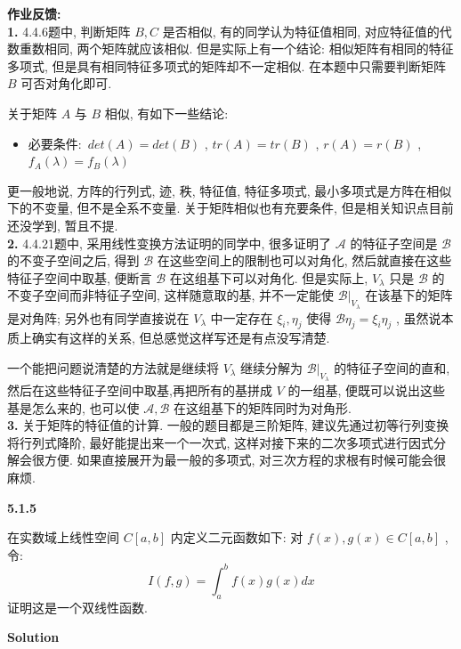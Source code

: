 \documentclass[11pt,a4paper,openany,oneside]{book}
\newcommand\Solution{\noindent\textbf{\textsf{Solution}}\par\medskip}
\begin{document}
\newpage
\textbf{作业反馈:} \\ 

\textbf{1.} 4.4.6题中, 判断矩阵 $ B, C $ 是否相似, 有的同学认为特征值相同, 对应特征值的代数重数相同, 两个矩阵就应该相似. 但是实际上有一个结论: 相似矩阵有相同的特征多项式, 但是具有相同特征多项式的矩阵却不一定相似. 在本题中只需要判断矩阵 $ B $ 可否对角化即可. 

关于矩阵 $ A $ 与 $ B $ 相似, 有如下一些结论:
\begin{itemize}
	\item 必要条件:\  $ det(A) = det(B) $ ,  $ tr(A) =tr(B) $ ,  $ r(A) = r(B) $ ,  $ f_A(\lambda) = f_B(\lambda) $ 
\end{itemize}
更一般地说, 方阵的行列式, 迹, 秩, 特征值, 特征多项式, 最小多项式是方阵在相似下的不变量, 但不是全系不变量. 关于矩阵相似也有充要条件, 但是相关知识点目前还没学到, 暂且不提.  \\ 

\textbf{2.} 4.4.21题中, 采用线性变换方法证明的同学中, 很多证明了 $ \mathcal{A} $ 的特征子空间是 $ \mathcal{B} $ 的不变子空间之后, 得到 $ \mathcal{B} $ 在这些空间上的限制也可以对角化, 然后就直接在这些特征子空间中取基, 便断言 $ \mathcal{B} $ 在这组基下可以对角化. 但是实际上,  $ V_{\lambda} $ 只是 $ \mathcal{B} $ 的不变子空间而非特征子空间, 这样随意取的基, 并不一定能使 $ \mathcal{B}|_{V_{\lambda}} $ 在该基下的矩阵是对角阵; 另外也有同学直接说在 $ V_{\lambda} $ 中一定存在 $ \xi_i, \eta_j $ 使得 $ \mathcal{B}\eta_j = \xi_i\eta_j $ , 虽然说本质上确实有这样的关系, 但总感觉这样写还是有点没写清楚.

一个能把问题说清楚的方法就是继续将 $ V_{\lambda} $ 继续分解为 $ \mathcal{B}|_{V_{\lambda}} $ 的特征子空间的直和, 然后在这些特征子空间中取基,再把所有的基拼成 $ V $ 的一组基, 便既可以说出这些基是怎么来的, 也可以使 $ \mathcal{A}, \mathcal{B} $ 在这组基下的矩阵同时为对角形.  \\ 

\textbf{3.} 关于矩阵的特征值的计算. 一般的题目都是三阶矩阵, 建议先通过初等行列变换将行列式降阶, 最好能提出来一个一次式, 这样对接下来的二次多项式进行因式分解会很方便. 如果直接展开为最一般的多项式, 对三次方程的求根有时候可能会很麻烦. 


\begin{myexample}
	\textbf{5.1.5}

在实数域上线性空间 $ C[a,b] $ 内定义二元函数如下: 对 $ f(x), g(x) \in C[a,b] $ , 令:
 $$  I(f, g) = \int_a^b f(x)g(x) dx  $$ 
证明这是一个双线性函数.  \\

\end{myexample}
\Solution  
\end{document}
